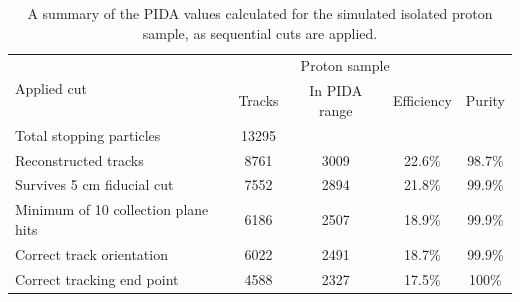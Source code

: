 \begin{table}
  \caption[A summary of the PIDA values calculated for the simulated isolated proton sample, as sequential cuts are applied]
          {A summary of the PIDA values calculated for the simulated isolated proton sample, as sequential cuts are applied.}
  \centering
  \label{tab:Isol_PIDA_Proton}
  \begin{tabular}{l c c c c}
    \toprule
    \multirow{2}{*}{Applied cut} & \multicolumn{3}{c}{Proton sample} \\ 
    \cmidrule{2-5}
      & Tracks & In PIDA range & Efficiency & Purity \\ 
    \midrule
      Total stopping particles            & 13295 &     &        & \\

      Reconstructed tracks                & 8761 & 3009 & 22.6\% & 98.7\% \\

      Survives 5 cm fiducial cut          & 7552 & 2894 & 21.8\% & 99.9\% \\

      Minimum of 10 collection plane hits & 6186 & 2507 & 18.9\% & 99.9\% \\

      Correct track orientation           & 6022 & 2491 & 18.7\% & 99.9\% \\

      Correct tracking end point          & 4588 & 2327 & 17.5\% & 100\% \\
    \bottomrule
  \end{tabular}
\end{table}

